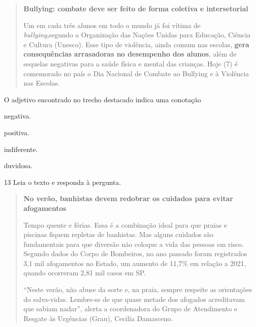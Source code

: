 \begin{quote}
\textbf{Bullying: combate deve ser feito de forma coletiva e intersetorial}

Um em cada três alunos em todo o mundo já foi vítima de
\textit{bullying},segundo a Organização das Nações Unidas para Educação,
Ciência e Cultura (Unesco). Esse tipo de violência, ainda comum nas
escolas, \textbf{gera consequências arrasadoras no desempenho dos alunos},
além de sequelas negativas para a saúde física e mental das crianças.
Hoje (7) é comemorado no país o Dia Nacional de Combate ao Bullying e à
Violência nas Escolas.

\end{quote}

\pagebreak
O adjetivo encontrado no trecho destacado indica uma conotação

\begin{escolha}
  \item negativa.

  \item positiva.

  \item indiferente.

  \item duvidosa.
\end{escolha}


\num{13} Leia o texto e responda à pergunta.

\begin{quote}
\textbf{No verão, banhistas devem redobrar os cuidados para evitar
afogamentos}

Tempo quente e férias. Essa é a combinação ideal para que praias e
piscinas fiquem repletas de banhistas. Mas alguns cuidados são
fundamentais para que diversão não coloque a vida das pessoas em risco.
Segundo dados do Corpo de Bombeiros, no ano passado foram registrados
3,1 mil afogamentos no Estado, um aumento de 11,7\% em relação a 2021,
quando ocorreram 2,81 mil casos em SP.

``Neste verão, não abuse da sorte e, na praia, sempre respeite as
orientações do salva-vidas. Lembre-se de que quase metade dos afogados
acreditavam que sabiam nadar'', alerta a coordenadora do Grupo de
Atendimento e Resgate às Urgências (Grau), Cecilia Damasceno.

\end{quote}

